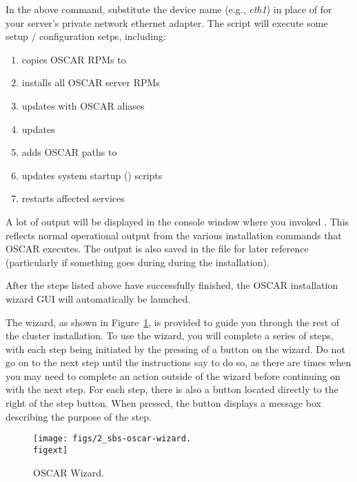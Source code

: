 In the above command, substitute the device name (e.g., \emph{eth1})
in place of  for your server's private network
ethernet adapter.  The script will execute some setup / configuration
setps, including:

\begin{enumerate}
\item copies OSCAR RPMs to 
\item installs all OSCAR server RPMs
\item updates  with OSCAR aliases
\item updates  
\item adds OSCAR paths to  
\item updates system startup () scripts
\item restarts affected services
\end{enumerate}

A lot of output will be displayed in the console window where you
invoked .  This reflects normal operational
output from the various installation commands that OSCAR executes.
The output is also saved in the file  for later
reference (particularly if something goes during during the
installation).

After the steps listed above have successfully finished, the OSCAR
installation wizard GUI will automatically be launched.
  
The wizard, as shown in Figure~\ref{fig:detailed-oscar-wizard}, is
provided to guide you through the rest of the cluster installation.
To use the wizard, you will complete a series of steps, with each step
being initiated by the pressing of a button on the wizard. Do not go
on to the next step until the instructions say to do so, as there are
times when you may need to complete an action outside of the wizard
before continuing on with the next step. For each step, there is also
a  button located directly to the right of the step
button.  When pressed, the  button displays a message box
describing the purpose of the step.

\begin{figure}[htbp]
  \begin{center}
    \texttt{[image: figs/2\_sbs-oscar-wizard.\\figext]}
    \caption{OSCAR Wizard.}
    \label{fig:detailed-oscar-wizard}
  \end{center}
\end{figure}
  

